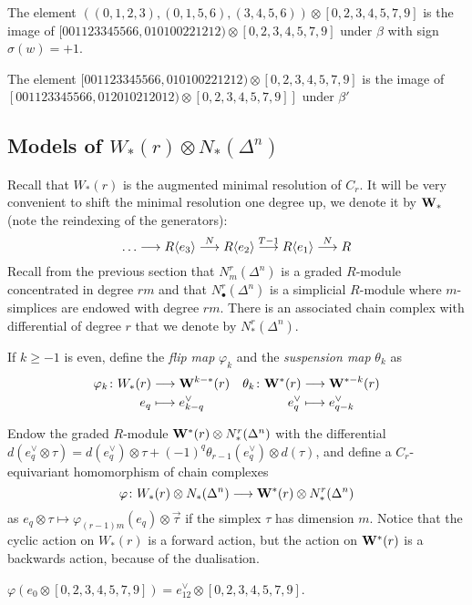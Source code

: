 \begin{example}\label{ex:103}
    The element $((0,1,2,3),(0,1,5,6),(3,4,5,6))\otimes [0,2,3,4,5,7,9]$ is the image of $[001123345566,010100221212)\otimes [0,2,3,4,5,7,9]$ under $\beta$ with sign $\sigma(w) = +1$.
\end{example}
\begin{example}\label{ex:104}
    The element $[001123345566,010100221212)\otimes [0,2,3,4,5,7,9]$ is the image of $[001123345566,012010212012)\otimes [0,2,3,4,5,7,9]]$ under $\beta'$
\end{example}
\subsection{Models of $W_*(r)\otimes N_*(\Delta^n)$}
Recall that $W_*(r)$ is the augmented minimal resolution of $C_r$. It will be very convenient to shift the minimal resolution one degree up, we denote it by $\mathbf{W}_*$ (note the reindexing of the generators):
\[
    \ldots\longrightarrow R\langle e_3\rangle \overset{N}{\longrightarrow} R\langle e_2\rangle \overset{T-1}{\longrightarrow} R\langle e_1\rangle \overset{N}{\longrightarrow} R
\]
Recall from the previous section that $N_m^r(\Delta^n)$ is a graded $R$-module concentrated in degree $rm$ and that $N_\bullet^r(\Delta^n)$ is a simplicial $R$-module where $m$-simplices are endowed with degree $rm$. There is an associated chain complex with differential of degree $r$ that we denote by $N_*^{r}(\Delta^n)$.

\begin{definition}
	If $k\geq -1$ is even, define the \emph{flip map} $\varphi_k$ and the \emph{suspension map} $\theta_k$ as
	\begin{align*}
	    \varphi_k\colon W_*(r)&\longrightarrow \mathbf{W}^{k-*}(r) &
	    \theta_k\colon \mathbf{W}^*(r)&\longrightarrow \mathbf{W}^{*-k}(r) \\
	    e_q&\longmapsto e^{\vee}_{k-q} &
	    e_q^\vee &\longmapsto e_{q-k}^\vee
	\end{align*}
\end{definition}
Endow the graded $R$-module $\mathbf{W}^*(r)\otimes N_*^r(\Delta^n)$ with the differential $d(e^\vee_q\otimes \tau) = d(e^\vee_q)\otimes \tau + (-1)^q \theta_{r-1}(e^\vee_q)\otimes d(\tau)$, and define a $C_r$-equivariant homomorphism of chain complexes
\[\varphi\colon  W_*(r)\otimes N_*(\Delta^n) \longrightarrow \mathbf{W}^*(r)\otimes N_*^r(\Delta^n)\]
as $e_{q}\otimes \tau\mapsto \varphi_{(r-1)m}(e_q)\otimes \vec{\tau}$ if the simplex $\tau$ has dimension $m$. Notice that the cyclic action on $W_*(r)$ is a forward action, but the action on $\mathbf{W}^*(r)$ is a backwards action, because of the dualisation.
\begin{example}\label{ex:105}
    $\varphi(e_0\otimes [0,2,3,4,5,7,9]) = e^\vee_{12}\otimes [0,2,3,4,5,7,9]$.
\end{example}

